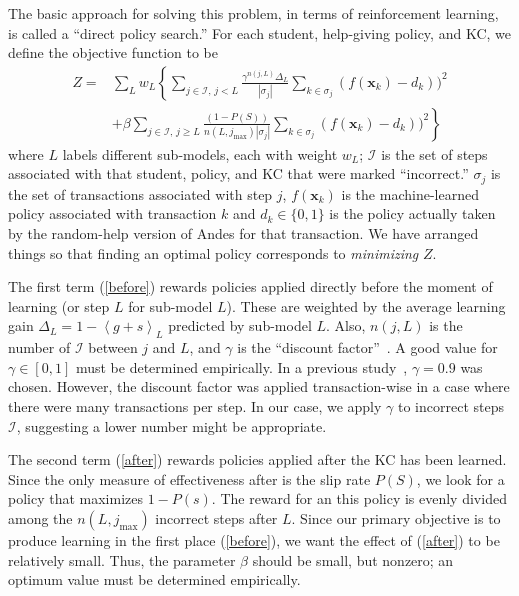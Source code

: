 \documentclass[11pt,letterpaper]{article}
\begin{document}
The basic approach for solving this problem, in terms of reinforcement
learning, is called a ``direct policy search.''
For each student, help-giving policy, and KC, we define the objective 
function to be 
%
\begin{subequations}
  \label{objective}
  \begin{align}
  Z =& \sum_L w_L \left\{\sum_{j \in \mathcal{I},\,j<L}  
       \frac{\gamma^{n(j,L)} \Delta_L}{\left|\sigma_j\right|}
  \sum_{k\in \sigma_j} \left(f(\mathbf{x}_k)-d_k\right))^2 \right.
     \label{before} \\
  &+\beta \left. \sum_{j \in \mathcal{I},\,j \ge L} \frac{(1-P(S))}
      {n(L,j_\mathrm{max})\left|\sigma_j\right|}
             \sum_{k\in \sigma_j} \left(f(\mathbf{x}_k)-d_k\right))^2
     \right\}
  \label{after}
  \end{align}
\end{subequations}
%
where $L$ labels different sub-models, each with weight $w_L$;
$\mathcal{I}$ is the set of steps associated
with that student, policy, and KC that were marked ``incorrect.''  
$\sigma_j$ is the set of transactions associated with step $j$,
$f(\mathbf{x}_k)$ is the machine-learned policy associated
with transaction $k$ and
$d_k\in \{0,1\}$ is the
policy actually taken by the random-help version of Andes for that 
transaction.
We have arranged things so that finding an optimal policy 
corresponds to {\em minimizing} $Z$.

The first term (\ref{before}) rewards policies applied directly before
the moment of learning (or step $L$ for sub-model $L$).  
These are weighted by the 
average learning gain $\Delta_L = 1-\left\langle g+s\right\rangle_L$ 
predicted by sub-model $L$.
Also, $n(j,L)$ is the number
of $\mathcal{I}$ between $j$ and $L$, 
and $\gamma$ is the ``discount factor''~\cite{ml}. 
A good value for $\gamma \in [0,1]$ must be determined empirically.
In a previous study~\cite{mint}, $\gamma=0.9$ was chosen.
However, the discount factor was applied transaction-wise in 
a case where there were many transactions per step.  In our case, 
we apply $\gamma$ to incorrect steps $\mathcal{I}$, suggesting a lower
number might be appropriate.

The second term (\ref{after}) rewards policies applied after
the KC has been learned.  Since the only measure of effectiveness
after is the slip rate $P(S)$, we look for a policy that maximizes
$1-P(s)$.  The reward for an this policy is evenly divided
among the $n(L,j_\mathrm{max})$ incorrect steps after $L$.
Since our primary objective is to produce learning in the first
place (\ref{before}), we want the effect of (\ref{after}) to be 
relatively small.
Thus, the parameter $\beta$ should be small, but nonzero; an
optimum value must be determined empirically.
\end{document}
